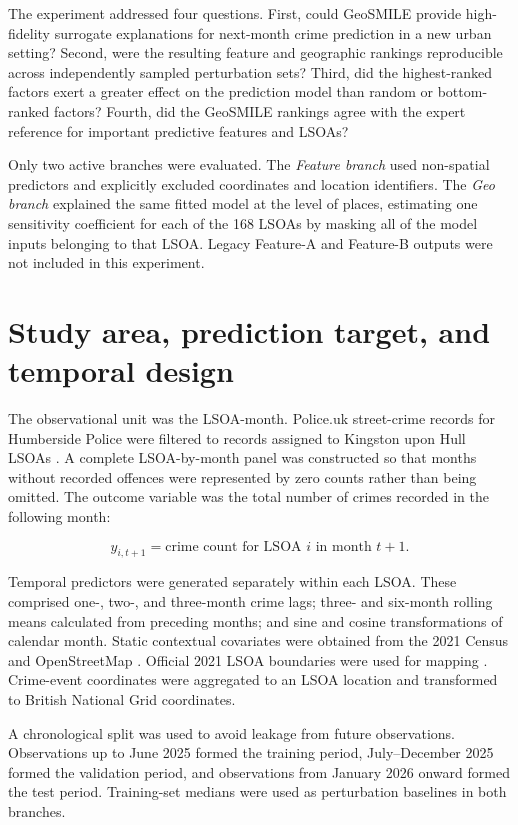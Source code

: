 The experiment addressed four questions. First, could GeoSMILE provide high-fidelity surrogate explanations for next-month crime prediction in a new urban setting? Second, were the resulting feature and geographic rankings reproducible across independently sampled perturbation sets? Third, did the highest-ranked factors exert a greater effect on the prediction model than random or bottom-ranked factors? Fourth, did the GeoSMILE rankings agree with the expert reference for important predictive features and LSOAs?

Only two active branches were evaluated. The \emph{Feature branch} used non-spatial predictors and explicitly excluded coordinates and location identifiers. The \emph{Geo branch} explained the same fitted model at the level of places, estimating one sensitivity coefficient for each of the 168 LSOAs by masking all of the model inputs belonging to that LSOA. Legacy Feature-A and Feature-B outputs were not included in this experiment.

\section{Study area, prediction target, and temporal design}
\label{sec:hull_data}

The observational unit was the LSOA-month. Police.uk street-crime records for Humberside Police were filtered to records assigned to Kingston upon Hull LSOAs \cite{policeuk}. A complete LSOA-by-month panel was constructed so that months without recorded offences were represented by zero counts rather than being omitted. The outcome variable was the total number of crimes recorded in the following month:

\begin{equation}
y_{i,t+1} = \text{crime count for LSOA } i \text{ in month } t+1.
\end{equation}

Temporal predictors were generated separately within each LSOA. These comprised one-, two-, and three-month crime lags; three- and six-month rolling means calculated from preceding months; and sine and cosine transformations of calendar month. Static contextual covariates were obtained from the 2021 Census and OpenStreetMap \cite{census2021,openstreetmap}. Official 2021 LSOA boundaries were used for mapping \cite{ons_lsoa2021}. Crime-event coordinates were aggregated to an LSOA location and transformed to British National Grid coordinates.

A chronological split was used to avoid leakage from future observations. Observations up to June 2025 formed the training period, July--December 2025 formed the validation period, and observations from January 2026 onward formed the test period. Training-set medians were used as perturbation baselines in both branches.


